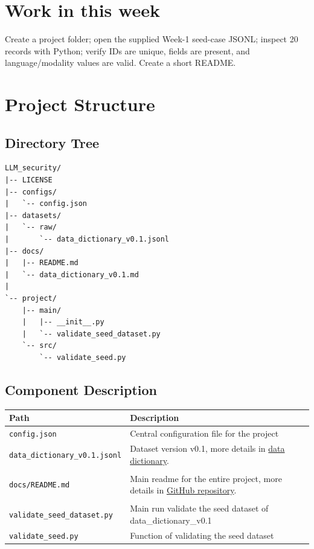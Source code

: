 \documentclass[a4paper,12pt]{report}
\begin{document}
\newpage
\chapter{Work in this week}
Create a project folder; open the supplied Week-1 seed-case JSONL; inspect 20 records with Python; verify IDs are unique, fields are present, and language/modality values are valid. Create a short README.

\chapter{Project Structure}
\section{Directory Tree}

\begin{lstlisting}[numbers=none, caption={Repository layout (LLM\_security)}, label={lst:tree}]
LLM_security/
|-- LICENSE
|-- configs/
|   `-- config.json
|-- datasets/
|   `-- raw/
|       `-- data_dictionary_v0.1.jsonl
|-- docs/
|   |-- README.md
|   `-- data_dictionary_v0.1.md
|
`-- project/
    |-- main/
    |   |-- __init__.py
    |   `-- validate_seed_dataset.py
    `-- src/
        `-- validate_seed.py
\end{lstlisting}

\section{Component Description}
{
\renewcommand{\arraystretch}{1.3}
\begin{longtable}{@{}p{5.8cm}p{10cm}@{}}
\toprule
Path & Description \\
\midrule
\endhead
\texttt{config.json} & Central configuration file for the project
\\
\texttt{data\_dictionary\_v0.1.jsonl} & Dataset version v0.1, more details in \href{https://github.com/HaiDreamer/LLM_security/blob/main/docs/data_dictionary_v0.1.md}{data dictionary}. \\
\\
\texttt{docs/README.md} & Main readme for the entire project, more details in \href{https://github.com/HaiDreamer/LLM_security}{GitHub repository}. \\
\\
\texttt{validate\_seed\_dataset.py} & Main run validate the seed dataset of data\_dictionary\_v0.1
\\
\texttt{validate\_seed.py} & Function of validating the seed dataset
\\
\bottomrule
\end{longtable}
}
\end{document}

